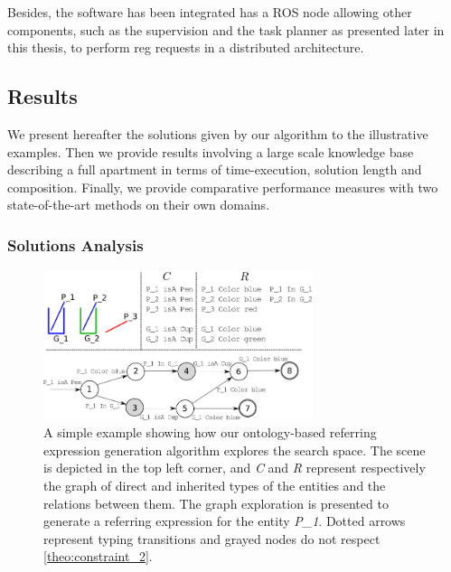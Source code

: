 \documentclass[a4paper,11pt,twoside]{StyleThese}
\begin{document}
Besides, the software has been integrated has a ROS node allowing other components, such as the supervision and the task planner as presented later in this thesis, to perform \acrshort{reg} requests in a distributed architecture.


\subsection{Results}
We present hereafter the solutions given by our algorithm to the illustrative examples. Then we provide results involving a large scale knowledge base describing a full apartment in terms of time-execution, solution length and composition. Finally, we provide comparative performance measures with two state-of-the-art methods on their own domains.

\subsubsection{Solutions Analysis}

\begin{figure}[hbtp]
\centering
\includegraphics[width=0.7\textwidth]{figures/chapter3/search.png}
\caption{A simple example showing how our ontology-based referring expression generation algorithm explores the search space. The scene is depicted in the top left corner, and \textit{C} and \textit{R} represent respectively the graph of direct and inherited types of the entities and the relations between them. The graph exploration is presented to generate a referring expression for the entity \textit{P\_1}. Dotted arrows represent typing transitions and grayed nodes do not respect \ref{theo:constraint_2}.}
\label{fig:search_example} 
\end{figure}
\end{document}
